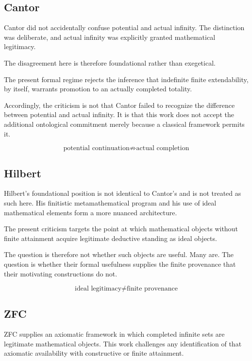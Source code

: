 \documentclass[11pt,a4paper]{article}
\begin{document}
\subsection*{Cantor}

Cantor did not accidentally confuse potential and actual infinity. The
distinction was deliberate, and actual infinity was explicitly granted
mathematical legitimacy.

The disagreement here is therefore foundational rather than
exegetical.

The present formal regime rejects the inference that indefinite finite
extendability, by itself, warrants promotion to an actually completed
totality.

Accordingly, the criticism is not that Cantor failed to recognize the
difference between potential and actual infinity. It is that this work
does not accept the additional ontological commitment merely because a
classical framework permits it.

\[
\boxed{
\text{potential continuation}
\not\Rightarrow
\text{actual completion}
}
\]

\subsection*{Hilbert}

Hilbert's foundational position is not identical to Cantor's and is not
treated as such here. His finitistic metamathematical program and his
use of ideal mathematical elements form a more nuanced architecture.

The present criticism targets the point at which mathematical objects
without finite attainment acquire legitimate deductive standing as
ideal objects.

The question is therefore not whether such objects are useful. Many
are. The question is whether their formal usefulness supplies the
finite provenance that their motivating constructions do not.

\[
\boxed{
\text{ideal legitimacy}
\neq
\text{finite provenance}
}
\]

\subsection*{ZFC}

ZFC supplies an axiomatic framework in which completed infinite sets
are legitimate mathematical objects. This work challenges any
identification of that axiomatic availability with constructive or
finite attainment.
\end{document}
